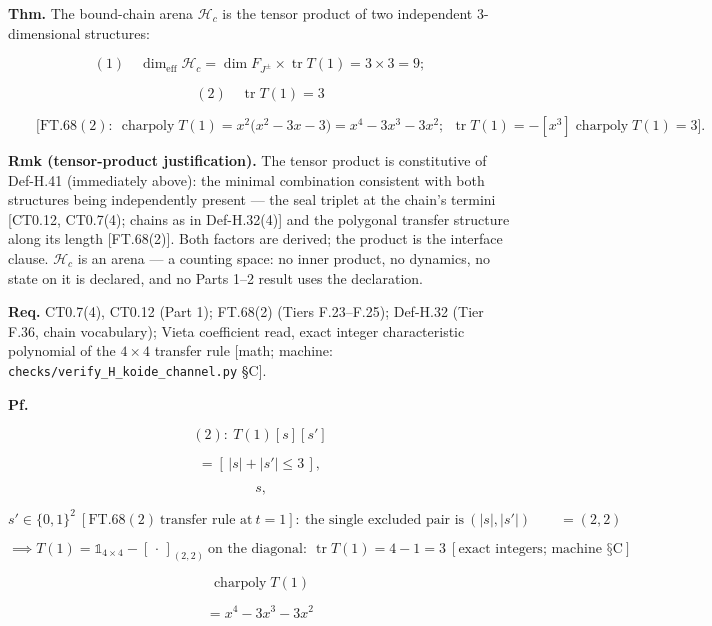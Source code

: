 \begin{theorem}\label{tag:FT-110}
\textbf{Thm.} The bound-chain arena $\mathcal H_c$ is the tensor product of two independent $3$-dimensional structures:

\[
(1)\quad\dim_{\mathrm{eff}}\mathcal H_c=\dim F_{J^\pm}\times\operatorname{tr}T(1)=3\times3=9;
\]

\[
(2)\quad\operatorname{tr}T(1)=3
\]

\[
\qquad \bigl[\mathrm{FT.68}(2):\ \operatorname{charpoly}T(1)=x^2\bigl(x^2-3x-3\bigr)=x^4-3x^3-3x^2;\ \ \operatorname{tr}T(1)=-[x^3]\operatorname{charpoly}T(1)=3\bigr].
\]

\textbf{Rmk (tensor-product justification).} The tensor product is constitutive of Def-H.41 (immediately above): the minimal combination consistent with both structures being independently present — the seal triplet at the chain's termini [CT0.12, CT0.7(4); chains as in Def-H.32(4)] and the polygonal transfer structure along its length [FT.68(2)]. Both factors are derived; the product is the interface clause. $\mathcal H_c$ is an arena — a counting space: no inner product, no dynamics, no state on it is declared, and no Parts 1–2 result uses the declaration.

\textbf{Req.} CT0.7(4), CT0.12 (Part 1); FT.68(2) (Tiers F.23–F.25); Def-H.32 (Tier F.36, chain vocabulary); Vieta coefficient read, exact integer characteristic polynomial of the $4\times4$ transfer rule [math; machine: \texttt{checks/\allowbreak{}verify\_\allowbreak{}H\_\allowbreak{}koide\_\allowbreak{}channel.py} §C].

\textbf{Pf.}

\[
(2):\ T(1)[s][s']
\]

\[
= [\,|s|+|s'|\le3\,],
\]

\[
\ s,
\]

\[
s'\in\{0,1\}^2\ [\mathrm{FT.68}(2)\ \text{transfer rule at}\ t=1]:\ \text{the single excluded pair is}\ (|s|,|s'|)\qquad = (2,2)
\]

\[
\implies T(1)=\mathbb 1_{4\times4}-[\,\cdot\,]_{(2,2)}\ \text{on the diagonal}:\ \operatorname{tr}T(1)=4-1=3\ [\text{exact integers; machine §C}]
\]

\[
\operatorname{charpoly}T(1)
\]

\[
= x^4-3x^3-3x^2
\]


\end{theorem}
